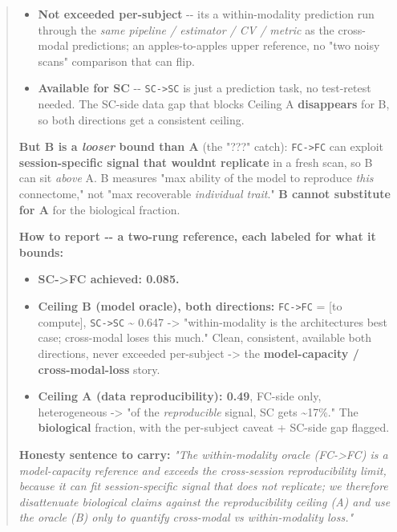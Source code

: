 \begin{quote}
\begin{itemize}
\tightlist
\item
  \textbf{Not exceeded per-subject} -\/- it\textquotesingle s a within-modality prediction run through the \emph{same pipeline / estimator / CV / metric} as the cross-modal predictions; an apples-to-apples upper reference, no "two noisy scans" comparison that can flip.
\item
  \textbf{Available for SC} -\/- \texttt{SC-\textgreater{}SC} is just a prediction task, no test-retest needed. The SC-side data gap that blocks Ceiling A \textbf{disappears} for B, so both directions get a consistent ceiling.
\end{itemize}

\textbf{But B is a \emph{looser} bound than A} (the "???" catch): \texttt{FC-\textgreater{}FC} can exploit \textbf{session-specific signal that wouldn\textquotesingle t replicate} in a fresh scan, so B can sit \emph{above} A. B measures "max ability of the model to reproduce \emph{this} connectome," not "max recoverable \emph{individual trait}." \textbf{B cannot substitute for A} for the biological fraction.

\textbf{How to report -\/- a two-rung reference, each labeled for what it bounds:}

\begin{itemize}
\tightlist
\item
  \textbf{SC-\textgreater FC achieved: 0.085.}
\item
  \textbf{Ceiling B (model oracle), both directions:} \texttt{FC-\textgreater{}FC} = {[}to compute{]}, \texttt{SC-\textgreater{}SC} \textasciitilde{} 0.647 -\textgreater{} "within-modality is the architecture\textquotesingle s best case; cross-modal loses this much." Clean, consistent, available both directions, never exceeded per-subject -\textgreater{} the \textbf{model-capacity / cross-modal-loss} story.
\item
  \textbf{Ceiling A (data reproducibility): 0.49}, FC-side only, heterogeneous -\textgreater{} "of the \emph{reproducible} signal, SC gets \textasciitilde17\%." The \textbf{biological} fraction, with the per-subject caveat + SC-side gap flagged.
\end{itemize}

\textbf{Honesty sentence to carry:} \emph{"The within-modality oracle (FC-\textgreater FC) is a model-capacity reference and exceeds the cross-session reproducibility limit, because it can fit session-specific signal that does not replicate; we therefore disattenuate biological claims against the reproducibility ceiling (A) and use the oracle (B) only to quantify cross-modal vs within-modality loss."}
\end{quote}


